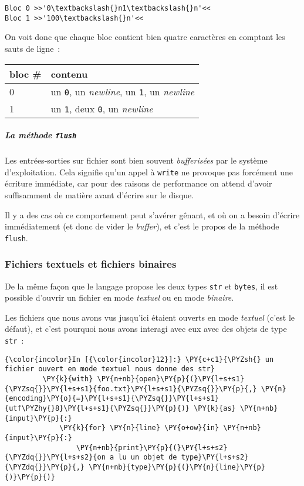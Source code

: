     \begin{Verbatim}[commandchars=\\\{\},frame=single,framerule=0.3mm,rulecolor=\color{cellframecolor}]
Bloc 0 >>'0\textbackslash{}n1\textbackslash{}n'<<
Bloc 1 >>'100\textbackslash{}n'<<
\end{Verbatim}

    On voit donc que chaque bloc contient bien quatre caractères en comptant
les sauts de ligne~:

\begin{longtable}[]{@{}ll@{}}
\toprule
bloc \# & contenu\tabularnewline
\midrule
\endhead
0 & un \texttt{0}, un \emph{newline}, un \texttt{1}, un
\emph{newline}\tabularnewline
1 & un \texttt{1}, deux \texttt{0}, un \emph{newline}\tabularnewline
\bottomrule
\end{longtable}

    \hypertarget{la-muxe9thode-flush}{%
\subparagraph{\texorpdfstring{La méthode
\texttt{flush}}{La méthode flush}}\label{la-muxe9thode-flush}}

    Les entrées-sorties sur fichier sont bien souvent \emph{bufferisées} par
le système d'exploitation. Cela signifie qu'un appel à \texttt{write} ne
provoque pas forcément une écriture immédiate, car pour des raisons de
performance on attend d'avoir suffisamment de matière avant d'écrire sur
le disque.

Il y a des cas où ce comportement peut s'avérer gênant, et où on a
besoin d'écrire immédiatement (et donc de vider le \emph{buffer}), et
c'est le propos de la méthode \texttt{flush}.

    \hypertarget{fichiers-textuels-et-fichiers-binaires}{%
\subsubsection{Fichiers textuels et fichiers
binaires}\label{fichiers-textuels-et-fichiers-binaires}}

    De la même façon que le langage propose les deux types \texttt{str} et
\texttt{bytes}, il est possible d'ouvrir un fichier en mode
\emph{textuel} ou en mode \emph{binaire}.

    Les fichiers que nous avons vus jusqu'ici étaient ouverts en mode
\emph{textuel} (c'est le défaut), et c'est pourquoi nous avons interagi
avec eux avec des objets de type \texttt{str}~:

    \begin{Verbatim}[commandchars=\\\{\},frame=single,framerule=0.3mm,rulecolor=\color{cellframecolor}]
{\color{incolor}In [{\color{incolor}12}]:} \PY{c+c1}{\PYZsh{} un fichier ouvert en mode textuel nous donne des str}
         \PY{k}{with} \PY{n+nb}{open}\PY{p}{(}\PY{l+s+s1}{\PYZsq{}}\PY{l+s+s1}{foo.txt}\PY{l+s+s1}{\PYZsq{}}\PY{p}{,} \PY{n}{encoding}\PY{o}{=}\PY{l+s+s1}{\PYZsq{}}\PY{l+s+s1}{utf\PYZhy{}8}\PY{l+s+s1}{\PYZsq{}}\PY{p}{)} \PY{k}{as} \PY{n+nb}{input}\PY{p}{:}
             \PY{k}{for} \PY{n}{line} \PY{o+ow}{in} \PY{n+nb}{input}\PY{p}{:}
                 \PY{n+nb}{print}\PY{p}{(}\PY{l+s+s2}{\PYZdq{}}\PY{l+s+s2}{on a lu un objet de type}\PY{l+s+s2}{\PYZdq{}}\PY{p}{,} \PY{n+nb}{type}\PY{p}{(}\PY{n}{line}\PY{p}{)}\PY{p}{)}
\end{Verbatim}


